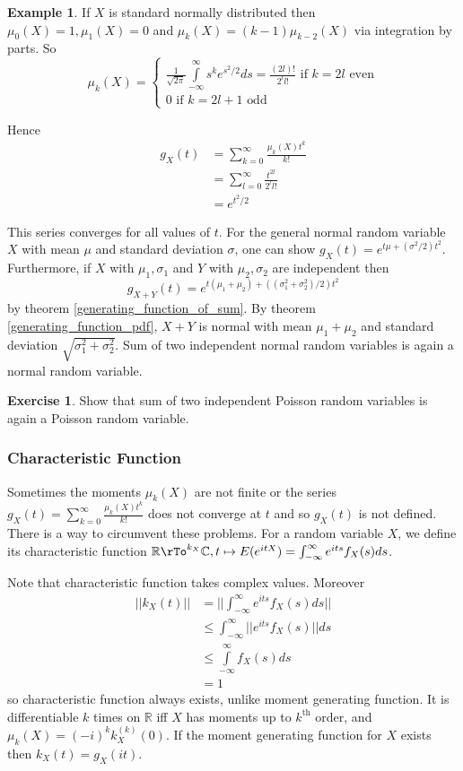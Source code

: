 \documentclass[12pt]{amsart}
\theoremstyle{definition}
\newtheorem{example}[theorem]{Example}
\newtheorem{exercise}[theorem]{Exercise}
\begin{document}
\begin{example} If $X$ is standard normally distributed then $\mu_0(X) = 1, \mu_1(X) = 0$ and $\mu_k(X) = (k-1)\mu_{k-2}(X)$ via integration by parts. So
$$\mu_k(X) = \begin{cases} \frac{1}{\sqrt{2\pi}} \int\limits_{-\infty}^{\infty} s^k e^{s^2/2} ds = \frac{(2l)!}{2^l l!} \text{ if } k = 2l \text{ even} \\ 0 \text{ if }k = 2l + 1 \text{ odd} \end{cases}$$

Hence
\begin{align*}
g_X(t) & = \sum\limits_{k=0}^{\infty} \frac{\mu_k(X) t^k}{k!} \\
 & = \sum\limits_{l=0}^{\infty} \frac{t^{2l}}{2^l l!} \\
 & = e^{t^2/2}
\end{align*}

This series converges for all values of $t$. For the general normal random variable $X$ with mean $\mu$ and standard deviation $\sigma$, one can show $g_X(t) = e^{t\mu + (\sigma^2/2)t^2}$. Furthermore, if $X$ with $\mu_1, \sigma_1$ and $Y$ with $\mu_2, \sigma_2$ are independent then
$$g_{X+Y}(t) = e^{t(\mu_1 + \mu_2) + ((\sigma_1^2 + \sigma_2^2)/2)t^2}$$
by theorem \ref{generating_function_of_sum}. By theorem \ref{generating_function_pdf}, $X+Y$ is normal with mean $\mu_1 + \mu_2$ and standard deviation $\sqrt{\sigma_1^2 + \sigma_2^2}$. Sum of two independent normal random variables is again a normal random variable.
\end{example}

\begin{exercise} Show that sum of two independent Poisson random variables is again a Poisson random variable.
\end{exercise}

\subsubsection{Characteristic Function} Sometimes the moments $\mu_k(X)$ are not finite or the series $g_X(t) = \sum\limits_{k=0}^{\infty} \frac{\mu_k(X)t^k}{k!}$ does not converge at $t$ and so $g_X(t)$ is not defined. There is a way to circumvent these problems.
\dfn For a random variable $X$, we define its characteristic function $\mathbb{R} \rTo^{k_X} \mathbb{C}, t \mapsto E(e^{itX}) = \int_{-\infty}^{\infty} e^{its} f_X(s)ds$.

Note that characteristic function takes complex values. Moreover
\begin{align*}
||k_X(t)|| & = ||\int_{-\infty}^{\infty} e^{its} f_X(s) ds|| \\
 & \leq \int_{-\infty}^{\infty} ||e^{its} f_X(s)|| ds \\
 & \leq \int\limits_{-\infty}^{\infty} f_X(s) ds \\
 & = 1
\end{align*}
so characteristic function always exists, unlike moment generating function. It is differentiable $k$ times on $\mathbb{R}$ iff $X$ has moments up to $k^{\text{th}}$ order, and $\mu_k(X) = (-i)^k k_X^{(k)}(0)$. If the moment generating function for $X$ exists then $k_X(t) = g_X(i t)$.
\end{document}
